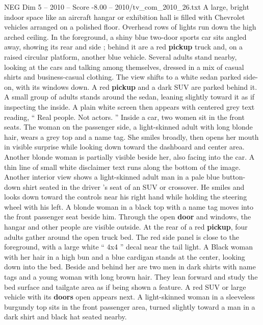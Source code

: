 \begin{textsample}{NEG Dim 5 – 2010 – Score -8.00 – 2010/tv\_com\_2010\_26.txt}  \label{ex:f5_neg_051}
A large, bright indoor space like an aircraft hangar or exhibition hall is filled with Chevrolet vehicles arranged on a polished floor.
Overhead rows of lights run down the high arched ceiling.
In the foreground, a shiny blue two-door sports car sits angled away, showing its rear and side ; behind it are a red \textbf{pickup} truck and, on a raised circular platform, another blue vehicle.
Several adults stand nearby, looking at the cars and talking among themselves, dressed in a mix of casual shirts and business-casual clothing.
The view shifts to a white sedan parked side-on, with its windows down.
A red \textbf{pickup} and a dark SUV are parked behind it.
A small group of adults stands around the sedan, leaning slightly toward it as if inspecting the inside.
A plain white screen then appears with centered grey text reading, “ Real people.
Not actors. ” Inside a car, two women sit in the front seats.
The woman on the passenger side, a light-skinned adult with long blonde hair, wears a grey top and a name tag.
She smiles broadly, then opens her mouth in visible surprise while looking down toward the dashboard and center area.
Another blonde woman is partially visible beside her, also facing into the car.
A thin line of small white disclaimer text runs along the bottom of the image.
Another interior view shows a light-skinned adult man in a pale blue button-down shirt seated in the driver ’s seat of an SUV or crossover.
He smiles and looks down toward the controls near his right hand while holding the steering wheel with his left.
A blonde woman in a black top with a name tag moves into the front passenger seat beside him.
Through the open \textbf{door} and windows, the hangar and other people are visible outside.
At the rear of a red \textbf{pickup}, four adults gather around the open truck bed.
The red side panel is close to the foreground, with a large white “ 4x4 ” decal near the tail light.
A Black woman with her hair in a high bun and a blue cardigan stands at the center, looking down into the bed.
Beside and behind her are two men in dark shirts with name tags and a young woman with long brown hair.
They lean forward and study the bed surface and tailgate area as if being shown a feature.
A red SUV or large vehicle with its \textbf{doors} open appears next.
A light-skinned woman in a sleeveless burgundy top sits in the front passenger area, turned slightly toward a man in a dark shirt and black hat seated nearby.

\end{textsample}
